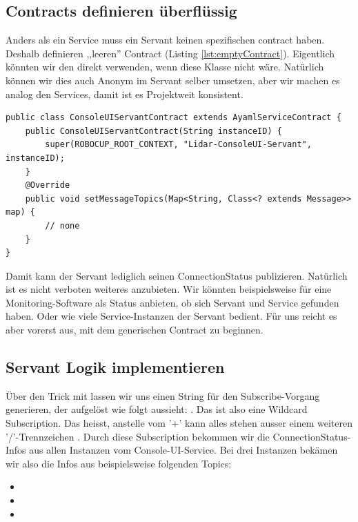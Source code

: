 \subsection{Contracts definieren überflüssig}
Anders als ein Service muss ein Servant keinen spezifischen \Gls{contract} haben. Deshalb definieren ,,leeren'' Contract (Listing \ref{lst:emptyContract}). Eigentlich könnten wir den  direkt verwenden, wenn diese Klasse nicht  wäre. Natürlich können wir dies auch Anonym im Servant selber umsetzen, aber wir machen es analog den Services, damit ist es Projektweit konsistent.
\begin{lstlisting}[caption={,,leerer Contract'' für den Servant},label={lst:emptyContract}]
public class ConsoleUIServantContract extends AyamlServiceContract {
    public ConsoleUIServantContract(String instanceID) {
        super(ROBOCUP_ROOT_CONTEXT, "Lidar-ConsoleUI-Servant", instanceID);
    }
    @Override
    public void setMessageTopics(Map<String, Class<? extends Message>> map) {
        // none
    }
}
\end{lstlisting}
Damit kann der Servant lediglich seinen ConnectionStatus publizieren. Natürlich ist es nicht verboten weiteres anzubieten. Wir könnten beispielsweise für eine Monitoring-Software als Status anbieten, ob sich Servant und Service gefunden haben. Oder wie viele Service-Instanzen der Servant bedient. Für uns reicht es aber vorerst aus, mit dem generischen Contract zu beginnen.

\subsection{Servant Logik implementieren}
Über den Trick mit  lassen wir uns einen String für den Subscribe-Vorgang generieren, der aufgelöst wie folgt aussieht: . Das ist also eine Wildcard Subscription. Das heisst, anstelle vom '+' kann alles stehen ausser einem weiteren '/'-Trennzeichen .
Durch diese Subscription bekommen wir die ConnectionStatus-Infos aus allen Instanzen vom Console-UI-Service. Bei drei Instanzen bekämen wir also die Infos aus beispielsweise folgenden Topics:
\begin{itemize}
	\item {}
	\item {}
	\item {}
\end{itemize}

